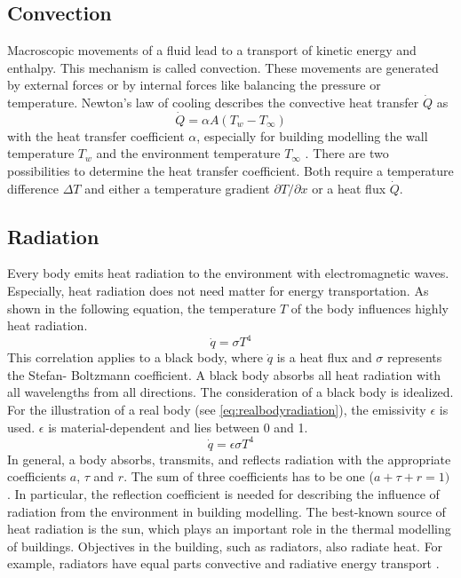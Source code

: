 \subsection{Convection}
\label{subsection:convection}

    Macroscopic movements of a fluid  lead to a transport of kinetic energy and enthalpy. This mechanism is called convection. These movements are generated by external forces or by internal forces like balancing the pressure or temperature.\cite{.2013}
    \newline
    Newton's law of cooling describes the convective heat transfer $\dot{Q}$ as 
    \begin{equation}
    \label{eq:newton}
        \dot{Q} = \alpha A (T_w - T_\infty)
    \end{equation}
    with the heat transfer coefficient $\alpha$, especially for building modelling the wall temperature $T_w$ and the environment temperature $T_\infty$ \cite{Griesinger.2019}
    . There are two possibilities to determine the heat transfer coefficient. Both require a temperature difference $\Delta T$ and either a temperature gradient $\partial T/\partial x$ or a heat flux $\dot{Q}$.
    \cite{.2013} 

\subsection{Radiation}
\label{subsection:radiation}

    Every body emits heat radiation to the environment with electromagnetic waves. Especially, heat radiation does not need matter for energy transportation. As shown in the following equation, the temperature $T$ of the body influences highly heat radiation.\cite{.2013} 
    \begin{equation}
    \label{eq:radiation}
        \dot{q} = \sigma T^4
    \end{equation}
    This correlation applies to a black body, where $\dot{q}$ is a heat flux and $\sigma$ represents the Stefan- Boltzmann coefficient. A black body absorbs all heat radiation with all wavelengths from all directions\cite{Griesinger.2019}. The consideration of a black body is idealized. For the illustration of a real body (see \autoref{eq:realbodyradiation}), the emissivity $\epsilon$ is used. $\epsilon$ is material-dependent and lies between 0 and 1.
    \begin{equation}
    \label{eq:realbodyradiation}
        \dot{q} = \epsilon \sigma T^4
    \end{equation}
    In general, a body absorbs, transmits, and reflects radiation with the appropriate coefficients $a$, $\tau$ and $r$. The sum of three coefficients has to be one ($a + \tau + r = 1)$
    \cite{Baehr.2016}.
    In particular, the reflection coefficient is needed for describing the influence of radiation from the environment in building modelling.
    \newline
    The best-known source of heat radiation is the sun, which plays an important role in the thermal modelling of buildings. Objectives in the building, such as radiators, also radiate heat. For example, radiators have equal parts convective and radiative energy transport \cite{Hazyuk.2012}. 
    
